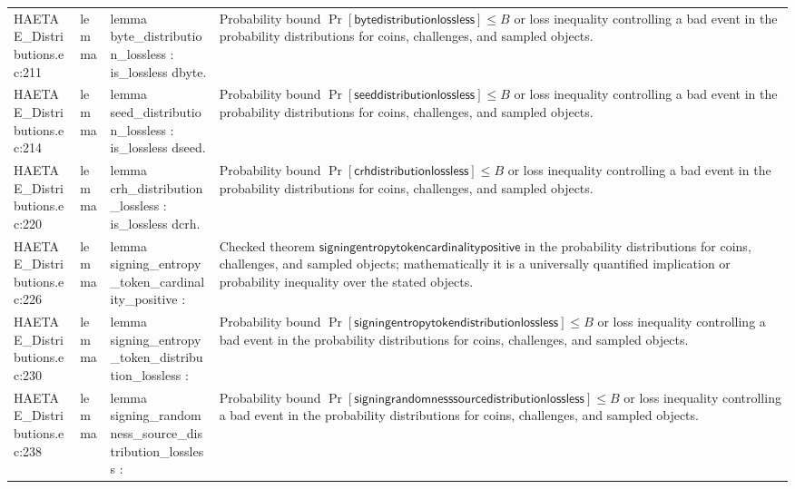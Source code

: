 \documentclass[10pt]{article}
\begin{document}
\begin{longtable}{L{0.11\textwidth}L{0.055\textwidth}L{0.385\textwidth}L{0.41\textwidth}}
HAETAE\_\allowbreak{}Distributions.\allowbreak{}ec:\allowbreak{}211 & lemma & {\ttfamily\scriptsize lemma byte\_\allowbreak{}distribution\_\allowbreak{}lossless : is\_\allowbreak{}lossless dbyte.} & Probability bound $\Pr[\mathsf{bytedistributionlossless}]\le B$ or loss inequality controlling a bad event in the probability distributions for coins, challenges, and sampled objects. \\
HAETAE\_\allowbreak{}Distributions.\allowbreak{}ec:\allowbreak{}214 & lemma & {\ttfamily\scriptsize lemma seed\_\allowbreak{}distribution\_\allowbreak{}lossless : is\_\allowbreak{}lossless dseed.} & Probability bound $\Pr[\mathsf{seeddistributionlossless}]\le B$ or loss inequality controlling a bad event in the probability distributions for coins, challenges, and sampled objects. \\
HAETAE\_\allowbreak{}Distributions.\allowbreak{}ec:\allowbreak{}220 & lemma & {\ttfamily\scriptsize lemma crh\_\allowbreak{}distribution\_\allowbreak{}lossless : is\_\allowbreak{}lossless dcrh.} & Probability bound $\Pr[\mathsf{crhdistributionlossless}]\le B$ or loss inequality controlling a bad event in the probability distributions for coins, challenges, and sampled objects. \\
HAETAE\_\allowbreak{}Distributions.\allowbreak{}ec:\allowbreak{}226 & lemma & {\ttfamily\scriptsize lemma signing\_\allowbreak{}entropy\_\allowbreak{}token\_\allowbreak{}cardinality\_\allowbreak{}positive :} & Checked theorem $\mathsf{signingentropytokencardinalitypositive}$ in the probability distributions for coins, challenges, and sampled objects; mathematically it is a universally quantified implication or probability inequality over the stated objects. \\
HAETAE\_\allowbreak{}Distributions.\allowbreak{}ec:\allowbreak{}230 & lemma & {\ttfamily\scriptsize lemma signing\_\allowbreak{}entropy\_\allowbreak{}token\_\allowbreak{}distribution\_\allowbreak{}lossless :} & Probability bound $\Pr[\mathsf{signingentropytokendistributionlossless}]\le B$ or loss inequality controlling a bad event in the probability distributions for coins, challenges, and sampled objects. \\
HAETAE\_\allowbreak{}Distributions.\allowbreak{}ec:\allowbreak{}238 & lemma & {\ttfamily\scriptsize lemma signing\_\allowbreak{}randomness\_\allowbreak{}source\_\allowbreak{}distribution\_\allowbreak{}lossless :} & Probability bound $\Pr[\mathsf{signingrandomnesssourcedistributionlossless}]\le B$ or loss inequality controlling a bad event in the probability distributions for coins, challenges, and sampled objects. \\

\end{longtable}
\end{document}
